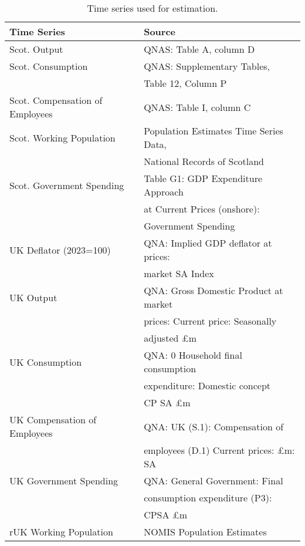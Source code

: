 \begin{table}[H]
    \centering
    \begin{tabular}{ll}
    \textbf{Time Series} & \textbf{Source}  \\ \hline \hline
    Scot. Output                      & QNAS: Table A, column D                                                       \\ \hline
    Scot. Consumption                 & QNAS: Supplementary Tables, \\& Table 12, Column P                                \\\hline
    Scot. Compensation of Employees & QNAS: Table I, column C                                                       \\\hline
    Scot. Working Population                & Population Estimates Time Series Data, \\ & National Records of Scotland                   \\\hline
    Scot. Government Spending & Table G1: GDP Expenditure Approach\\ &at Current Prices (onshore):\\ &Government Spending \\\hline
    UK Deflator (2023=100)          & QNA: Implied GDP deflator at  prices: \\ &market SA Index                                  \\\hline
    UK Output                       & QNA: Gross Domestic Product at market \\ & prices: Current price: Seasonally \\ &adjusted £m   \\\hline
    UK Consumption                  & QNA: 0 Household final consumption \\ &expenditure: Domestic concept \\ &CP SA £m             \\\hline
    UK Compensation of Employees  & QNA: UK (S.1): Compensation of \\ &employees (D.1) Current prices: £m: SA            \\\hline
    UK Government Spending & QNA: General Government: Final \\ & consumption expenditure (P3):\\ &CPSA £m\\\hline
    rUK Working Population                & NOMIS Population Estimates                                                            
    \end{tabular}
    \vspace{0.5cm}
    \caption{Time series used for estimation.}
    \label{table:data_for_estimation}
\end{table} 